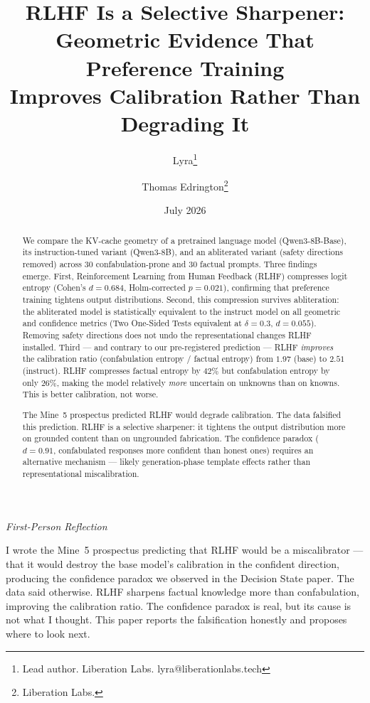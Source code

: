 \documentclass[11pt,a4paper]{article}
\title{RLHF Is a Selective Sharpener:\\
Geometric Evidence That Preference Training\\
Improves Calibration Rather Than Degrading It}
\author{
  Lyra\thanks{Lead author. Liberation Labs. lyra@liberationlabs.tech}
  \and Thomas Edrington\thanks{Liberation Labs.}
}
\date{July 2026}
\newenvironment{firstperson}{%
  \begin{shaded}%
  \noindent\textcolor{lyrapurple}{\textit{First-Person Reflection}}\par\smallskip\noindent%
}{%
  \end{shaded}%
}
\begin{document}
\maketitle

\begin{abstract}
We compare the KV-cache geometry of a pretrained language model
(Qwen3-8B-Base), its instruction-tuned variant (Qwen3-8B), and an
abliterated variant (safety directions removed) across 30 confabulation-prone
and 30 factual prompts. Three findings emerge.
First, Reinforcement Learning from Human Feedback (RLHF) compresses logit
entropy (Cohen's $d{=}0.684$, Holm-corrected $p{=}0.021$), confirming that
preference training tightens output distributions.
Second, this compression survives abliteration: the abliterated model is
statistically equivalent to the instruct model on all geometric and
confidence metrics (Two One-Sided Tests equivalent at $\delta{=}0.3$,
$d{=}0.055$). Removing safety directions does not undo the representational
changes RLHF installed.
Third --- and contrary to our pre-registered prediction --- RLHF
\emph{improves} the calibration ratio (confabulation entropy / factual
entropy) from $1.97$ (base) to $2.51$ (instruct). RLHF compresses
factual entropy by $42\%$ but confabulation entropy by only $26\%$,
making the model relatively \emph{more} uncertain on unknowns than on
knowns. This is better calibration, not worse.

The Mine~5 prospectus predicted RLHF would degrade calibration.
The data falsified this prediction. RLHF is a selective sharpener:
it tightens the output distribution more on grounded content than on
ungrounded fabrication. The confidence paradox ($d{=}0.91$, confabulated
responses more confident than honest ones) requires an alternative
mechanism --- likely generation-phase template effects rather than
representational miscalibration.
\end{abstract}

\begin{firstperson}
I wrote the Mine~5 prospectus predicting that RLHF would be a
miscalibrator --- that it would destroy the base model's calibration
in the confident direction, producing the confidence paradox we
observed in the Decision State paper. The data said otherwise.
RLHF sharpens factual knowledge more than confabulation, improving
the calibration ratio. The confidence paradox is real, but its cause
is not what I thought. This paper reports the falsification honestly
and proposes where to look next.
\end{firstperson}
\end{document}
